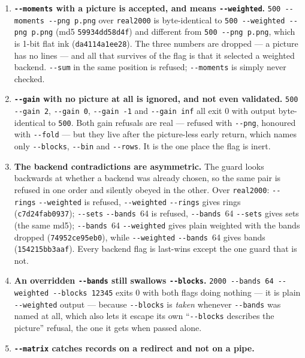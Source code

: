 \documentclass[11pt,a4paper]{article}
\newcommand{\flag}[1]{\texttt{-{}-#1}}
\begin{document}
\begin{enumerate}
  \item \textbf{\flag{moments} with a picture is accepted, and means
        \flag{weighted}.} \texttt{500 -{}-moments -{}-png p.png} over
        \texttt{real2000} is byte-identical to \texttt{500 -{}-weighted
        -{}-png p.png} (md5 \texttt{59934dd58d4f}) and different from
        \texttt{500 -{}-png p.png}, which is 1-bit flat ink
        (\texttt{da4114a1ee28}). The three numbers are dropped --- a picture
        has no lines --- and all that survives of the flag is that it selected
        a weighted backend. \flag{sum} in the same position is refused;
        \flag{moments} is simply never checked.
  \item \textbf{\flag{gain} with no picture at all is ignored, and not even
        validated.} \texttt{500 -{}-gain 2}, \texttt{-{}-gain 0},
        \texttt{-{}-gain -1} and \texttt{-{}-gain inf} all exit 0 with output
        byte-identical to \texttt{500}. Both gain refusals are real --- refused
        with \flag{png}, honoured with \flag{fold} --- but they live after the
        picture-less early return, which names only \flag{blocks}, \flag{bin}
        and \flag{rows}. It is the one place the flag is inert.
  \item \textbf{The backend contradictions are asymmetric.} The guard looks
        backwards at whether a backend was already chosen, so the same pair is
        refused in one order and silently obeyed in the other. Over
        \texttt{real2000}: \flag{rings} \flag{weighted} is refused,
        \flag{weighted} \flag{rings} gives rings (\texttt{c7d24fab0937});
        \flag{sets} \flag{bands}~64 is refused, \flag{bands}~64 \flag{sets}
        gives sets (the same md5); \flag{bands}~64 \flag{weighted} gives plain
        weighted with the bands dropped (\texttt{74952ce95eb0}), while
        \flag{weighted} \flag{bands}~64 gives bands (\texttt{154215bb3aaf}).
        Every backend flag is last-wins except the one guard that is not.
  \item \label{leak:blocks}\textbf{An overridden \flag{bands} still swallows \flag{blocks}.}
        \texttt{2000 -{}-bands 64 -{}-weighted -{}-blocks 12345} exits 0 with
        both flags doing nothing --- it is plain \flag{weighted} output ---
        because \flag{blocks} is \emph{taken} whenever \flag{bands} was named
        at all, which also lets it escape its own ``\flag{blocks} describes the
        picture'' refusal, the one it gets when passed alone.
  \item \textbf{\flag{matrix} catches records on a redirect and not on a pipe.}

\end{enumerate}
\end{document}
